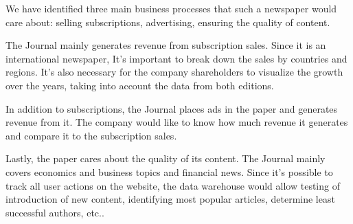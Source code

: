 
We have identified three main business processes that such a newspaper would care about:
selling subscriptions, advertising, ensuring the quality of content.

The Journal mainly generates revenue from subscription sales. Since it is an international newspaper, It’s important to break down the sales by countries and regions. It’s also necessary for the company shareholders to visualize the growth over the years, taking into account the data from both editions.

In addition to subscriptions, the Journal places ads in the paper and generates revenue from
it. The company would like to know how much revenue it generates and compare it to the
subscription sales.

Lastly, the paper cares about the quality of its content. The Journal mainly covers economics and business topics and financial news. Since it’s possible to track all user actions on the website, the data warehouse would allow testing of introduction of new content, identifying most popular articles, determine least successful authors, etc..

